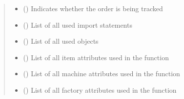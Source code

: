 \documentclass[letterpaper,10pt,english]{sphinxmanual}
\begin{document}
\begin{fulllineitems}
\begin{fulllineitems}
\begin{quote}
\begin{description}
\begin{itemize}
\item {} 
\sphinxAtStartPar
{} () \textendash{} Indicates whether the order is being tracked

\item {} 
\sphinxAtStartPar
{} (\sphinxstyleliteralemphasis{\sphinxupquote{{[}}}\sphinxstyleliteralemphasis{\sphinxupquote{{]}}}\sphinxstyleliteralemphasis{\sphinxupquote{, }}) \textendash{} List of all used import statements

\item {} 
\sphinxAtStartPar
{} (\sphinxstyleliteralemphasis{\sphinxupquote{{[}}}\sphinxstyleliteralemphasis{\sphinxupquote{{]}}}\sphinxstyleliteralemphasis{\sphinxupquote{, }}) \textendash{} List of all used objects

\item {} 
\sphinxAtStartPar
{} (\sphinxstyleliteralemphasis{\sphinxupquote{{[}}}\sphinxstyleliteralemphasis{\sphinxupquote{, }}\sphinxstyleliteralemphasis{\sphinxupquote{{]}}}\sphinxstyleliteralemphasis{\sphinxupquote{, }}) \textendash{} List of all item attributes used in the function

\item {} 
\sphinxAtStartPar
{} (\sphinxstyleliteralemphasis{\sphinxupquote{{[}}}\sphinxstyleliteralemphasis{\sphinxupquote{, }}\sphinxstyleliteralemphasis{\sphinxupquote{{]}}}\sphinxstyleliteralemphasis{\sphinxupquote{, }}) \textendash{} List of all machine attributes used in the function

\item {} 
\sphinxAtStartPar
{} (\sphinxstyleliteralemphasis{\sphinxupquote{{[}}}\sphinxstyleliteralemphasis{\sphinxupquote{, }}\sphinxstyleliteralemphasis{\sphinxupquote{{]}}}\sphinxstyleliteralemphasis{\sphinxupquote{, }}) \textendash{} List of all factory attributes used in the function


\end{itemize}
\end{description}
\end{quote}
\end{fulllineitems}
\end{fulllineitems}
\end{document}
